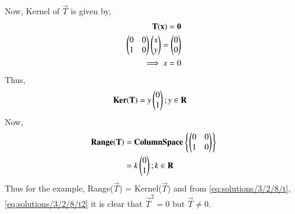 Now, Kernel of $\vec{T}$ is given by,
\begin{align}
    \mathbf{T}(\mathbf{x}) = \mathbf{0}  \\
    \begin{pmatrix}0&0\\1&0\end{pmatrix}\begin{pmatrix}x\\y\end{pmatrix} = \begin{pmatrix}0\\0\end{pmatrix} \\
    \implies x = 0
\end{align}
Thus, 
\begin{align}
    \mathbf{Ker}(\mathbf{T}) &= y\begin{pmatrix}0\\1\end{pmatrix} ; y \in \mathbf{R}
\end{align}
Now, 
\begin{align}
    \mathbf{Range}(\mathbf{T}) &= \mathbf{ColumnSpace}\left\{\begin{pmatrix}0&0\\1&0\end{pmatrix}\right\} \\
    &= k\begin{pmatrix}0\\1\end{pmatrix} ; k \in \mathbf{R}
\end{align}
Thus for the example, Range($\vec{T}$) = Kernel($\vec{T}$) and from \eqref{eq:solutions/3/2/8/t}, \eqref{eq:solutions/3/2/8/t2} it is clear that 
$\vec{T}^2 = 0$ but $\vec{T}\ne 0$.

